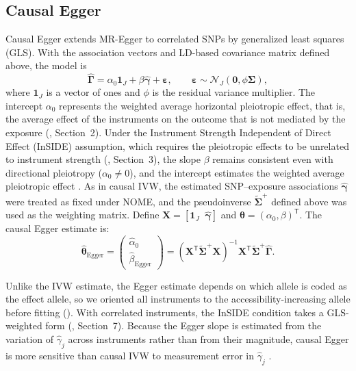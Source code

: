 \subsection{Causal Egger}
\label{sec:gls-egger}
Causal Egger extends MR-Egger to correlated SNPs by generalized least squares (GLS). With the association vectors and LD-based covariance matrix defined above, the model is
\begin{equation*}
\hat{\boldsymbol{\Gamma}}
=
\alpha_0\boldsymbol 1_J
+\beta\hat{\boldsymbol{\gamma}}
+\boldsymbol{\varepsilon},
\qquad
\boldsymbol{\varepsilon}
\sim
\mathcal N_J
(\boldsymbol 0,\phi \boldsymbol{\Sigma}),
\end{equation*}
where $\boldsymbol 1_J$ is a vector of ones and $\phi$ is the residual variance multiplier. The intercept $\alpha_0$ represents the weighted average horizontal pleiotropic effect, that is, the average effect of the instruments on the outcome that is not mediated by the exposure (, Section~2). Under the Instrument Strength Independent of Direct Effect (InSIDE) assumption, which requires the pleiotropic effects to be unrelated to instrument strength (, Section~3), the slope $\beta$ remains consistent even with directional pleiotropy ($\alpha_0\neq0$), and the intercept estimates the weighted average pleiotropic effect \cite{bowden2015egger,burgess2017interpreting}. As in causal IVW, the estimated SNP--exposure associations $\hat{\boldsymbol{\gamma}}$ were treated as fixed under NOME, and the pseudoinverse $\widetilde{\boldsymbol{\Sigma}}^{+}$ defined above was used as the weighting matrix. Define $\boldsymbol{X}=[\boldsymbol{1}_J\;\;\hat{\boldsymbol{\gamma}}]$ and $\boldsymbol{\theta}=(\alpha_0,\beta)^{\mathsf T}$. The causal Egger estimate is:
\begin{equation*}
\hat{\boldsymbol{\theta}}_{\text{Egger}}
=
\begin{pmatrix}
\hat{\alpha}_0\\
\hat{\beta}_{\text{Egger}}
\end{pmatrix}
=
\left(
\boldsymbol X^{\mathsf T}
\widetilde{\boldsymbol{\Sigma}}^{+}\boldsymbol X
\right)^{-1}
\boldsymbol X^{\mathsf T}
\widetilde{\boldsymbol{\Sigma}}^{+}
\hat{\boldsymbol{\Gamma}}.
\end{equation*}

\noindent Unlike the IVW estimate, the Egger estimate depends on which allele is coded as the effect allele, so we oriented all instruments to the accessibility-increasing allele before fitting (). With correlated instruments, the InSIDE condition takes a GLS-weighted form (, Section~7). Because the Egger slope is estimated from the variation of $\hat{\gamma}_j$ across instruments rather than from their magnitude, causal Egger is more sensitive than causal IVW to measurement error in $\hat{\gamma}_j$ \cite{bowden2016nome}.

